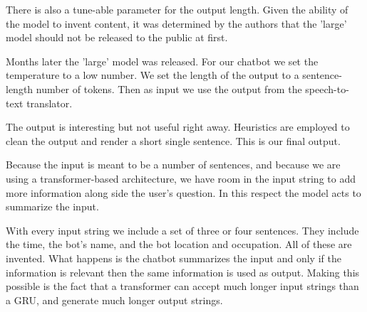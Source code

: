 There is also a tune-able parameter for the output length. Given the ability of the model to invent content, it was determined by the authors that the 'large' model should not be released to the public at first. 

Months later the 'large' model was released. For our chatbot we set the temperature to a low number. We set the length of the output to a sentence-length number of tokens. Then as input we use the output from the speech-to-text translator.

The output is interesting but not useful right away. Heuristics are employed to clean the output and render a short single sentence. This is our final output.

Because the input is meant to be a number of sentences, and because we are using a transformer-based architecture, we have room in the input string to add more information along side the user's question. In this respect the model acts to summarize the input. 

With every input string we include a set of three or four sentences. They include the time, the bot's name, and the bot location and occupation. All of these are invented. What happens is the chatbot summarizes the input and only if the information is relevant then the same information is used as output. Making this possible is the fact that a transformer can accept much longer input strings than a GRU, and generate much longer output strings.